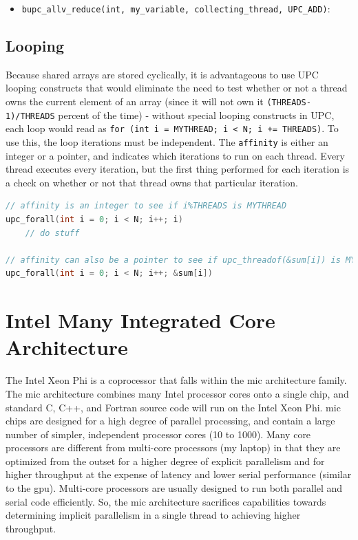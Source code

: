 \documentclass[10pt]{article}
\begin{document}
\begin{flushleft}
\begin{itemize}
\item {\tt bupc\_allv\_reduce(int, my\_variable, collecting\_thread, UPC\_ADD)}: 
\end{itemize}


\subsection{Looping}

Because shared arrays are stored cyclically, it is advantageous to use UPC looping constructs that would eliminate the need to test whether or not a thread owns the current element of an array (since it will not own it {\tt (THREADS-1)/THREADS} percent of the time) - without special looping constructs in UPC, each loop would read as {\tt for (int i = MYTHREAD; i < N; i += THREADS)}. To use this, the loop iterations must be independent. The {\tt affinity} is either an integer or a pointer, and indicates which iterations to run on each thread. Every thread executes every iteration, but the first thing performed for each iteration is a check on whether or not that thread owns that particular iteration. 

\begin{lstlisting}[language=C]
// affinity is an integer to see if i%THREADS is MYTHREAD
upc_forall(int i = 0; i < N; i++; i)
	// do stuff

// affinity can also be a pointer to see if upc_threadof(&sum[i]) is MYTHREAD
upc_forall(int i = 0; i < N; i++; &sum[i])
\end{lstlisting}



\section{Intel Many Integrated Core Architecture}

The Intel Xeon Phi is a coprocessor that falls within the \gls{mic} architecture family. The \gls{mic} architecture combines many Intel processor cores onto a single chip, and standard C, C++, and Fortran source code will run on the Intel Xeon Phi. \gls{mic} chips are designed for a high degree of parallel processing, and contain a large number of simpler, independent processor cores (10 to 1000). Many core processors are different from multi-core processors (my laptop) in that they are optimized from the outset for a higher degree of explicit parallelism and for higher throughput at the expense of latency and lower serial performance (similar to the \gls{gpu}). Multi-core processors are usually designed to run both parallel and serial code efficiently. So, the \gls{mic} architecture sacrifices capabilities towards determining implicit parallelism in a single thread to achieving higher throughput. 

\end{flushleft}
\end{document}
